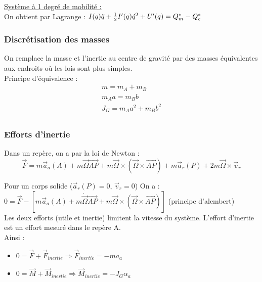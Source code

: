 \documentclass[../main.tex]{subfiles}
\begin{document}
\quad \underline{Système à 1 degré de mobilité :}\\
On obtient par Lagrange : $I(q) \Ddot{q} + \frac{1}{2} I'(q) \dot{q}^2 + U'(q) = Q_m^* - Q_e^*$\\

\subsubsection{Discrétisation des masses}
On remplace la masse et l'inertie au centre de gravité par des masses équivalentes aux endroits où les lois sont plus simples.\\

Principe d'équivalence : \begin{equation}
    \begin{gathered}
        m =  m_A + m_B\\
        m_Aa = m_Bb\\
        J_G = m_A a^2 + m_B b^2\\
    \end{gathered}
\end{equation}

\subsubsection{Efforts d'inertie}
Dans un repère, on a par la loi de Newton : \begin{equation}
    \Vec{F} = m\Vec{a}_a(A) + m\Vec{\Omega} \Vec{AP} + m\Vec{\Omega} \times (\Vec{\Omega} \times \Vec{AP}) + m\Vec{a}_r(P) + 2m\Vec{\Omega}\times \Vec{v}_r
\end{equation}

Pour un corps solide ($\Vec{a}_r(P) = 0$, $\Vec{v}_r = 0$) On a : $0 = \Vec{F}-[m\Vec{a}_a(A) + m\dot{\Vec{\Omega}} \Vec{AP} + m\Vec{\Omega} \times (\Vec{\Omega} \times \Vec{AP})]$ (principe d'alembert)\\

Les deux efforts (utile et inertie) limitent la vitesse du système. L'effort d'inertie est un effort mesuré dans le repère A.\\

Ainsi : \begin{itemize}
    \item $0 = \Vec{F} + \Vec{F}_{inertie} \Rightarrow \Vec{F}_{inertie} = -ma_a$\\
    \item $0 = \Vec{M} + \Vec{M}_{inertie} \Rightarrow \Vec{M}_{inertie} = -J_G \alpha_a$\\
\end{itemize}
\end{document}
